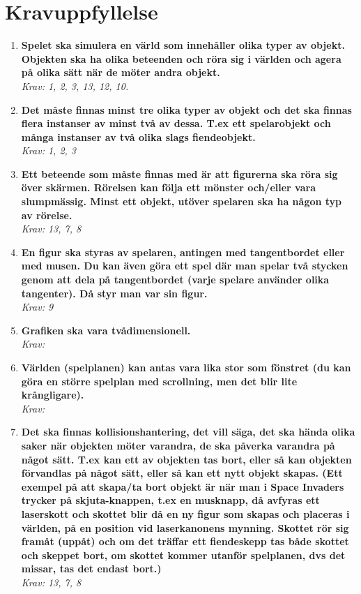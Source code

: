 \documentclass[12pt]{TDP005mall}
\begin{document}
\clearpage 

\section{Kravuppfyllelse}
\begin{enumerate}
    \item \textbf{Spelet ska simulera en värld som innehåller olika typer av objekt. Objekten ska ha olika beteenden och röra sig i världen och agera på olika sätt när de möter andra objekt.} \\ \emph{Krav: 1, 2, 3, 13, 12, 10.}
    
    \item \textbf{Det måste finnas minst tre olika typer av objekt och det ska finnas flera instanser av minst två av dessa. T.ex ett spelarobjekt och många instanser av två olika slags fiendeobjekt.} \\ \emph{Krav: 1, 2, 3}
    
    \item \textbf{Ett beteende som måste finnas med är att figurerna ska röra sig över skärmen. Rörelsen kan följa ett mönster och/eller vara slumpmässig. Minst ett objekt, utöver spelaren ska ha någon typ av rörelse.} \\ \emph{Krav: 13, 7, 8}
    
    \item \textbf{En figur ska styras av spelaren, antingen med tangentbordet eller med musen. Du kan även göra ett spel där man spelar två stycken genom att dela på tangentbordet (varje spelare använder olika tangenter). Då styr man var sin figur.} \\ \emph{Krav: 9}
    
    \item \textbf{Grafiken ska vara tvådimensionell.} \\ \emph{Krav:}
    
    \item \textbf{Världen (spelplanen) kan antas vara lika stor som fönstret (du kan göra en större spelplan med scrollning, men det blir lite krångligare).} \\ \emph{Krav:}
    
    \item \textbf{Det ska finnas kollisionshantering, det vill säga, det ska hända olika saker när objekten möter varandra, de ska påverka varandra på något sätt. T.ex kan ett av objekten tas bort, eller så kan objekten förvandlas på något sätt, eller så kan ett nytt objekt skapas. (Ett exempel på att skapa/ta bort objekt är när man i Space Invaders trycker på skjuta-knappen, t.ex en musknapp, då avfyras ett laserskott och skottet blir då en ny figur som skapas och placeras i världen, på en position vid laserkanonens mynning. Skottet rör sig framåt (uppåt) och om det träffar ett fiendeskepp tas både skottet och skeppet bort, om skottet kommer utanför spelplanen, dvs det missar, tas det endast bort.)} \\ \emph{Krav: 13, 7, 8}
    

\end{enumerate}
\end{document}
